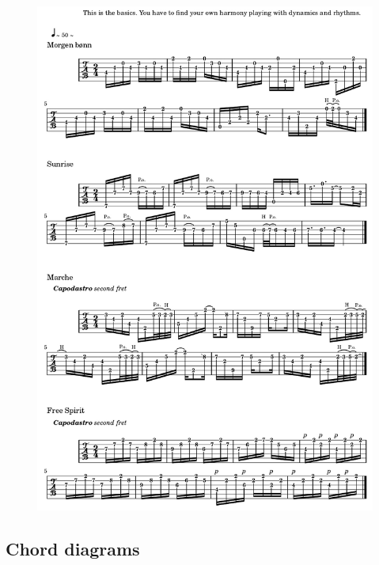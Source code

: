 \begin{figure}[H]
\begin{center}
\includegraphics[scale=0.32]{img/5573}
\end{center}
\end{figure}

\newpage
\subsection*{\quad Chord diagrams}
\label{kjcccc}

